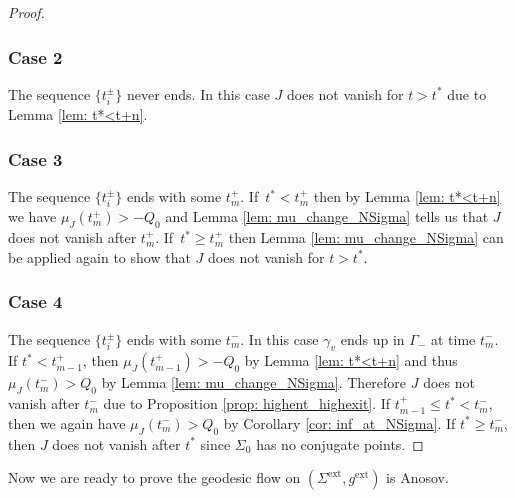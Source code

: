 \documentclass[JEP,XML,SOM,Unicode,NoFloatCountersInSection]{cedram}
\newcommand{\ext}{\mathrm{ext}}
\theoremstyle{definition}
\renewcommand{\>}{{\rangle}}
\newcommand{\<}{{\langle}}
\begin{document}
\begin{proof}
\subsubsection*{Case 2} The sequence $\{t_i^{\pm}\}$ never ends. In this case $J$ does not vanish for $t>t^*$ due to Lemma \ref{lem: t*<t+n}.

\subsubsection*{Case 3} The sequence $\{t_i^{\pm}\}$ ends with some $t^+_m$. If~$t^*<t^+_m$ then by Lemma \ref{lem: t*<t+n} we have $\mu_J(t^+_{m})>-Q_0$ and Lemma \ref{lem: mu_change_NSigma} tells us that $J$ does not vanish after $t^+_m$. If~$t^*\geq t^+_m$ then Lemma \ref{lem: mu_change_NSigma} can be applied again to show that $J$ does not vanish for $t>t^*$.

\subsubsection*{Case 4} The sequence $\{t_i^{\pm}\}$ ends with some $t^-_m$. In this case $\gamma_v$ ends up in $\Gamma_-$ at time $t^-_m$. If $t^*<t^+_{m-1}$, then $\mu_J(t^+_{m-1})>-Q_0$ by Lemma \ref{lem: t*<t+n} and thus $\mu_J(t^-_{m})>Q_0$ by Lemma \ref{lem: mu_change_NSigma}. Therefore $J$ does not vanish after $t^-_{m}$ due to Proposition \ref{prop: highent_highexit}. If $t^+_{m-1}\leq t^*<t^-_{m}$, then we again have $\mu_J(t^-_{m})>Q_0$ by Corollary \ref{cor: inf_at_NSigma}. If $t^*\geq t^-_{m}$, then $J$ does not vanish after $t^*$ since $\Sigma_0$ has no conjugate points.
\end{proof}

Now we are ready to prove the geodesic flow on $(\Sigma^{\ext}, g^{\ext})$ is Anosov.
\end{document}
